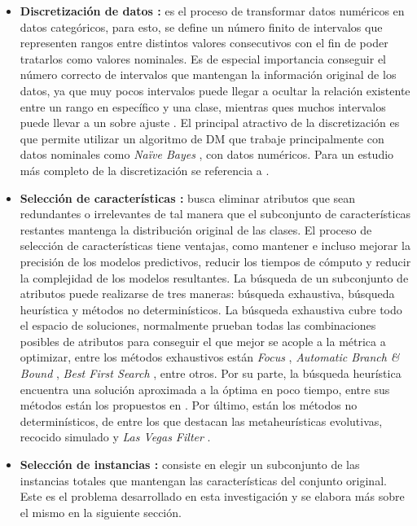 \begin{itemize}
\item \textbf{Discretización de datos \cite{garcia2016data,garcia2013survey}:}
es el proceso de transformar datos numéricos en datos categóricos, para esto, se define un número finito de intervalos que representen rangos entre distintos valores consecutivos con el fin de poder tratarlos como valores nominales. Es de especial importancia conseguir el número correcto de intervalos que mantengan la información original de los datos, ya que muy pocos intervalos puede llegar a ocultar la relación existente entre un rango en específico y una clase, mientras ques muchos intervalos puede llevar a un sobre ajuste \cite{cios2007data}. El principal atractivo de la discretización es que permite utilizar un algoritmo de DM que trabaje principalmente con datos nominales como \emph{Naïve Bayes} \cite{yang2009discretization}, con datos numéricos. Para un estudio más completo de la discretización se referencia a \cite{garcia2013survey}.

\item \textbf{Selección de características \cite{garcia2016data,liu2012feature}:}
busca eliminar atributos que sean redundantes o irrelevantes de tal manera que el subconjunto de características restantes mantenga la distribución original de las clases. El proceso de selección de características tiene ventajas, como mantener e incluso mejorar la precisión de los modelos predictivos, reducir los tiempos de cómputo y reducir la complejidad de los modelos resultantes. La búsqueda de un subconjunto de atributos puede realizarse de tres maneras: búsqueda exhaustiva, búsqueda heurística y métodos no determinísticos. La búsqueda exhaustiva cubre todo el espacio de soluciones, normalmente prueban todas las combinaciones posibles de atributos para conseguir el que mejor se acople a la métrica a optimizar, entre los métodos exhaustivos están \emph{Focus} \cite{almuallim1991learning}, \emph{Automatic Branch \& Bound} \cite{liul1998monotonic}, \emph{Best First Search} \cite{xu1988best}, entre otros. Por su parte, la búsqueda heurística encuentra una solución aproximada a la óptima en poco tiempo, entre sus métodos están los propuestos en \cite{dash1997feature,koller1996toward,battiti1994using}. Por último, están los métodos no determinísticos, de entre los que destacan las metaheurísticas evolutivas, recocido simulado y \emph{Las Vegas Filter} \cite{liu1996probabilistic}.

\item \textbf{Selección de instancias \cite{garcia2016data}:}
consiste en elegir un subconjunto de las instancias totales que mantengan las características del conjunto original. Este es el problema desarrollado en esta investigación y se elabora más sobre el mismo en la siguiente sección.
\end{itemize}

